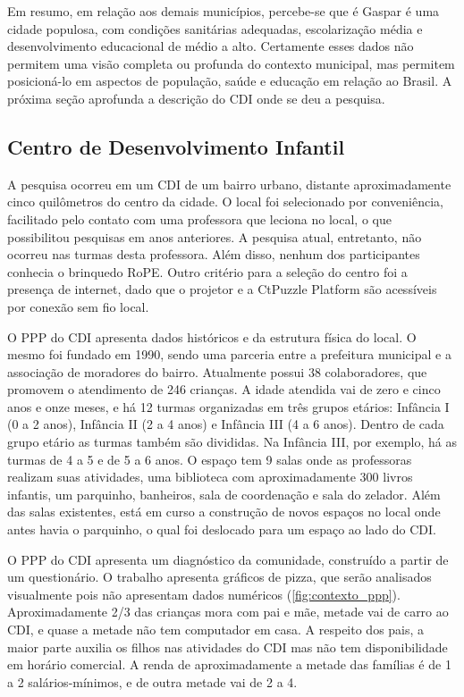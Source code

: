 Em resumo, em relação aos demais municípios, percebe-se que é Gaspar é uma cidade populosa, com condições sanitárias adequadas, escolarização média e desenvolvimento educacional de médio a alto. Certamente esses dados não permitem uma visão completa ou profunda do contexto municipal, mas permitem posicioná-lo em aspectos de população, saúde e educação em relação ao Brasil. A próxima seção aprofunda a descrição do CDI onde se deu a pesquisa.

\subsection{Centro de Desenvolvimento Infantil}
\label{sec:cdi}
A pesquisa ocorreu em um \ac{CDI} de um bairro urbano, distante aproximadamente cinco quilômetros do centro da cidade. O local foi selecionado por conveniência, facilitado pelo contato com uma professora que leciona no local, o que possibilitou pesquisas em anos anteriores. A pesquisa atual, entretanto, não ocorreu nas turmas desta professora. Além disso, nenhum dos participantes conhecia o brinquedo RoPE. Outro critério para a seleção do centro foi a presença de internet, dado que o projetor e a CtPuzzle Platform são acessíveis por conexão sem fio local.

O \ac{PPP} do \ac{CDI} apresenta dados históricos e da estrutura física do local. O mesmo foi fundado em 1990, sendo uma parceria entre a prefeitura municipal e a associação de moradores do bairro. Atualmente possui 38 colaboradores, que promovem o atendimento de 246 crianças. A idade atendida vai de zero e cinco anos e onze meses, e há 12 turmas organizadas em três grupos etários: Infância I (0 a 2 anos), Infância II (2 a 4 anos) e Infância III (4 a 6 anos). Dentro de cada grupo etário as turmas também são divididas. Na Infância III, por exemplo, há as turmas de 4 a 5 e de 5 a 6 anos. O espaço tem 9 salas onde as professoras realizam suas atividades, uma biblioteca com aproximadamente 300 livros infantis, um parquinho, banheiros, sala de coordenação e sala do zelador. Além das salas existentes, está em curso a construção de novos espaços no local onde antes havia o parquinho, o qual foi deslocado para um espaço ao lado do CDI. 

O \ac{PPP} do \ac{CDI} apresenta um diagnóstico da comunidade, construído a partir de um questionário. O trabalho apresenta gráficos de pizza, que serão analisados visualmente pois não apresentam dados numéricos (\autoref{fig:contexto_ppp}). Aproximadamente 2/3 das crianças mora com pai e mãe, metade vai de carro ao \ac{CDI}, e quase a metade não tem computador em casa. A respeito dos pais, a maior parte auxilia os filhos nas atividades do \ac{CDI} mas não tem disponibilidade em horário comercial. A renda de aproximadamente a metade das famílias é de 1 a 2 salários-mínimos, e de outra metade vai de 2 a 4.

